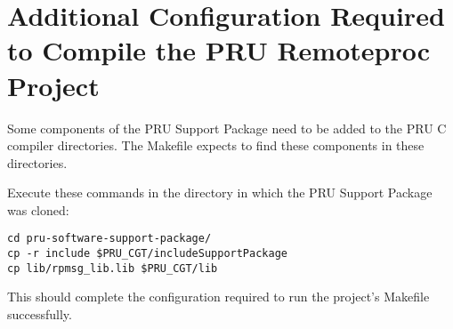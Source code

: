 \section{Additional Configuration Required to Compile the PRU Remoteproc Project}

Some components of the PRU Support Package need to be added to the PRU C compiler directories.  The Makefile expects to find these components in these directories.

Execute these commands in the directory in which the PRU Support Package was cloned:

\begin{verbatim}
cd pru-software-support-package/
cp -r include $PRU_CGT/includeSupportPackage
cp lib/rpmsg_lib.lib $PRU_CGT/lib
\end{verbatim}

This should complete the configuration required to run the project's Makefile successfully.




